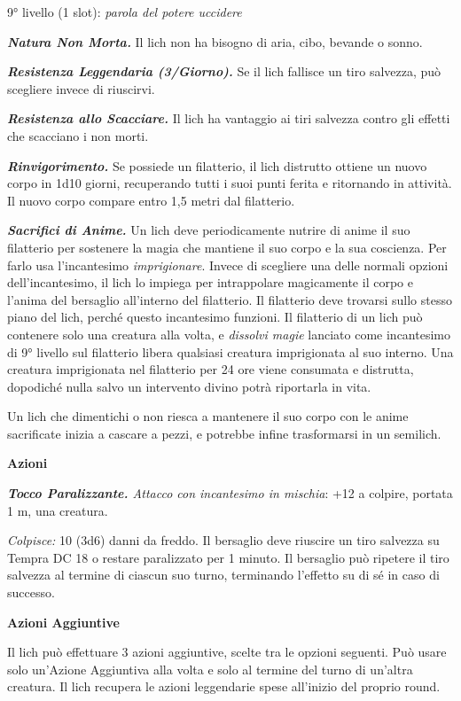 \begin{multicols}{2}
9° livello (1 slot): \emph{parola del potere uccidere}

\emph{\textbf{Natura Non Morta.}} Il lich non ha bisogno di aria, cibo,
bevande o sonno.

\emph{\textbf{Resistenza Leggendaria (3/Giorno).}} Se il lich fallisce
un tiro salvezza, può scegliere invece di riuscirvi.

\emph{\textbf{Resistenza allo Scacciare.}} Il lich ha vantaggio ai tiri
salvezza contro gli effetti che scacciano i non morti.

\emph{\textbf{Rinvigorimento.}} Se possiede un filatterio, il lich
distrutto ottiene un nuovo corpo in 1d10 giorni, recuperando tutti i
suoi punti ferita e ritornando in attività. Il nuovo corpo compare entro
1,5 metri dal filatterio.

\emph{\textbf{Sacrifici di Anime.}} Un lich deve periodicamente nutrire
di anime il suo filatterio per sostenere la magia che mantiene il suo
corpo e la sua coscienza. Per farlo usa l'incantesimo
\emph{imprigionare}. Invece di scegliere una delle normali opzioni
dell'incantesimo, il lich lo impiega per intrappolare magicamente il
corpo e l'anima del bersaglio all'interno del filatterio. Il filatterio
deve trovarsi sullo stesso piano del lich, perché questo incantesimo
funzioni. Il filatterio di un lich può contenere solo una creatura alla
volta, e \emph{dissolvi magie} lanciato come incantesimo di 9° livello
sul filatterio libera qualsiasi creatura imprigionata al suo interno.
Una creatura imprigionata nel filatterio per 24 ore viene consumata e
distrutta, dopodiché nulla salvo un intervento divino potrà riportarla
in vita.

Un lich che dimentichi o non riesca a mantenere il suo corpo con le
anime sacrificate inizia a cascare a pezzi, e potrebbe infine
trasformarsi in un semilich.

\smallskip\textbf{Azioni}

\emph{\textbf{Tocco Paralizzante.} Attacco con incantesimo in mischia}:
+12 a colpire, portata 1 m, una creatura.

\emph{Colpisce:} 10 (3d6) danni da freddo. Il bersaglio deve riuscire un
tiro salvezza su Tempra DC 18 o restare paralizzato per 1 minuto.
Il bersaglio può ripetere il tiro salvezza al termine di ciascun suo
turno, terminando l'effetto su di sé in caso di successo.

\textbf{Azioni Aggiuntive}

Il lich può effettuare 3 azioni aggiuntive, scelte tra le opzioni
seguenti. Può usare solo un'Azione Aggiuntiva alla volta e solo al
termine del turno di un'altra creatura. Il lich recupera le azioni
leggendarie spese all'inizio del proprio round.


\end{multicols}
